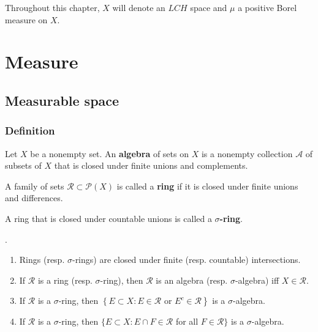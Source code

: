 \documentclass[12pt, a4paper, oneside]{book}
\begin{document}
Throughout this chapter, $X$ will denote an $LCH$ space and $\mu$ a positive Borel measure on $X$.


\chapter{Measure} %
\section{Measurable space} %
\subsection{Definition}

\begin{definition}
    Let $X$ be a nonempty set.
    An \textbf{algebra} of sets on $X$ is a nonempty collection $\mathcal{A}$ of subsets of $X$ that is closed under finite unions and complements.
\end{definition}

\begin{definition}
    A family of sets $\mathcal{R} \subset \mathcal{P}(X)$ is called a \textbf{ring} if it is closed under finite unions and differences.

    A ring that is closed under countable unions is called a \textbf{$\sigma$-ring}.
\end{definition}

\begin{proposition}.
    \begin{enumerate}
        \item
              Rings (resp. $\sigma$-rings) are closed under finite (resp. countable) intersections.
        \item
              If $\mathcal{R}$ is a ring (resp. $\sigma$-ring), then $\mathcal{R}$ is an algebra (resp. $\sigma$-algebra) iff $X \in \mathcal{R}$.
        \item
              If $\mathcal{R}$ is a $\sigma$-ring, then $\left\{E \subset X: E \in \mathcal{R}\right.$ or $\left.E^c \in \mathcal{R}\right\}$ is a $\sigma$-algebra.
        \item
              If $\mathcal{R}$ is a $\sigma$-ring, then $\{E \subset X: E \cap F \in \mathcal{R}$ for all $F \in \mathcal{R}\}$ is a $\sigma$-algebra.
    \end{enumerate}
\end{proposition}
\end{document}
